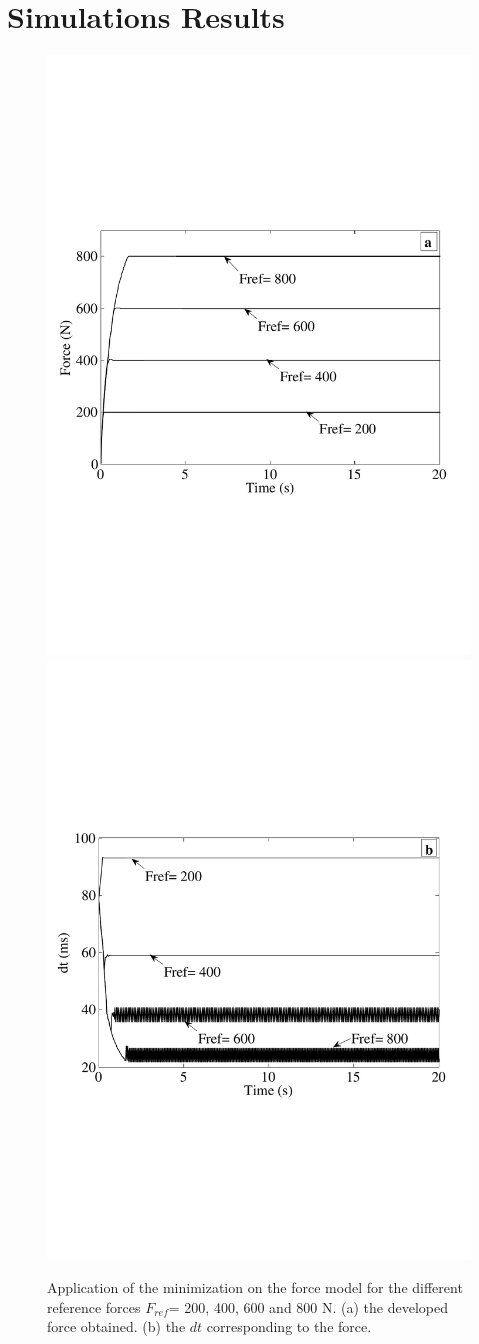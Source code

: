 \documentclass[10pt,twocolumn,letterpaper, 
]{article}
\begin{document}
\section{Simulations Results}

\begin{figure}[ht!]
		\includegraphics[width=0.48\columnwidth]{sfmin200800sfatokimoy.pdf} 
		 \includegraphics[width=0.48\columnwidth]{sfminsansfatdt200_800.pdf} 
		 \caption{Application of the minimization on the force model for the different reference forces $F_{ref}$= 200, 400, 600 and 800 N. (a) the developed force obtained. (b) the $dt$ corresponding to the force.}
 \end{figure}
\end{document}
